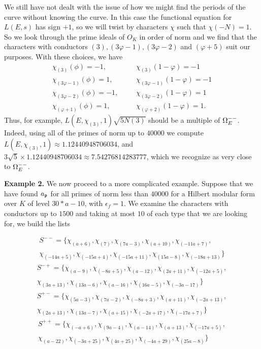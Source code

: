 We still have not dealt with the issue of how we might find the periods of the curve without knowing
the curve. In this case the functional equation for $L(E, s)$ has sign $+1$, so we will twist by characters
$\chi$ such that $\chi(-N) = 1$. So we look through the prime ideals of $O_K$ in order of norm
and we find that the characters with conductors $(3), (3 \varphi - 1), (3 \varphi - 2)$ and $(\varphi + 5)$
suit our purposes. With these choices, we have
\begin{eqnarray*}
    \chi_{(3)}(\phi) = -1, \ \  && \ \ \chi_{(3)}(1 - \varphi) = -1 \\
    \chi_{(3\varphi - 1)}(\phi) = 1, \ \  && \ \ \chi_{(3\varphi - 1)}(1 - \varphi) = -1 \\
    \chi_{(3\varphi - 2)}(\phi) = -1, \ \  && \ \ \chi_{(3\varphi - 2)}(1 - \varphi) = 1 \\
    \chi_{(\varphi + 1)}(\phi) = 1, \ \  && \ \ \chi_{(\varphi + 2)}(1 - \varphi) = 1.
\end{eqnarray*}
Thus, for example, $L(E, \chi_{(3)}, 1) \sqrt{5 N(3)}$ should be a multiple of $\Omega^{--}_E$. Indeed, using all
of the primes of norm up to $40000$ we compute $ L(E, \chi_{(3)}, 1) \approx 1.12440948706034$, and
$3 \sqrt {5} \times 1.12440948706034 \approx 7.54276814283777$, which we recognize as very close to
$\Omega^{--}_E$.

\textbf{Example 2.} We now proceed to a more complicated example. Suppose that we have found $a_{\mathfrak{p}}$ for all
primes of norm less than $40000$ for a Hilbert modular form over $K$ of level $30*a - 10$, with $\epsilon_f = 1$.
We examine the characters with conductors up to $1500$ and taking at most $10$ of each type that we
are looking for, we build the lists

\begin{multline}
S^{--} = \big\{\chi_{(a + 6)}, \chi_{(7)}, \chi_{(7a - 3)}, \chi_{(a + 10)}, \chi_{(-11a + 7)}, \\
\chi_{(-14a + 5)}, \chi_{(-15a + 4)}, \chi_{(-15a + 11)}, \chi_{(15a - 8)}, \chi_{(-18a + 13)}\big\}
\end{multline}
\begin{multline}
S^{-+} = \big\{\chi_{(a - 9)}, \chi_{(-8a + 5)}, \chi_{(a - 12)}, \chi_{(2a + 11)}, \chi_{(-12a + 5)}, \\
\chi_{(3a + 13)}, \chi_{(13a - 6)}, \chi_{(a - 16)}, \chi_{(16a - 5)}, \chi_{(-3a - 17)}\big\}
\end{multline}
\begin{multline}
S^{+-} = \big\{\chi_{(5a - 3)}, \chi_{(7a - 2)}, \chi_{(-8a + 3)}, \chi_{(a + 11)}, \chi_{(-2a + 13)}, \\
\chi_{(2a + 13)}, \chi_{(13a - 7)}, \chi_{(a + 15)}, \chi_{(-2a + 17)}, \chi_{(-17a + 7)}\big\}
\end{multline}
\begin{multline}
S^{++} = \big\{\chi_{(-a + 6)}, \chi_{(9a - 4)}, \chi_{(a - 14)}, \chi_{(a + 13)}, \chi_{(-17a + 5)}, \\
\chi_{(a - 22)}, \chi_{(-3a + 25)}, \chi_{(4a + 25)}, \chi_{(-4a + 29)}, \chi_{(25a - 8)}\big\}
\end{multline}

